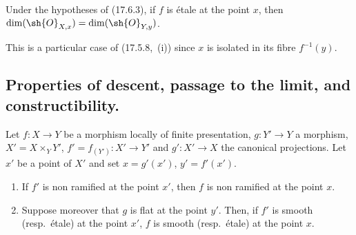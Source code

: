 \begin{proposition}[17.6.4]
\label{IV.17.6.4}
Under the hypotheses of (17.6.3), if $f$ is \'etale at the point $x$, then $\dim(\sh{O}_{X,x})=\dim(\sh{O}_{Y,y})$.
\end{proposition}

This is a particular case of (17.5.8,~(i)) since $x$ is isolated in its fibre $f^{-1}(y)$.


\subsection{Properties of descent, passage to the limit, and constructibility.}
\label{subsection:IV.17.7}


\begin{proposition}[17.7.1]
\label{IV.17.7.1}
Let $f:X\to Y$ be a morphism locally of finite presentation, $g:Y'\to Y$ a morphism, $X'=X\times_Y Y'$, $f'=f_{(Y')}:X'\to Y'$ and $g':X'\to X$ the canonical projections.
Let $x'$ be a point of $X'$ and set $x=g'(x')$, $y'=f'(x')$.
\begin{enumerate}[label=(\roman*)]
  \item If $f'$ is non ramified at the point $x'$, then $f$ is non ramified at the point $x$.
  \item Suppose moreover that $g$ is flat at the point $y'$.
  Then, if $f'$ is smooth (resp.\ \'etale) at the point $x'$, $f$ is smooth (resp.\ \'etale) at the point $x$.
\end{enumerate}
\end{proposition}

